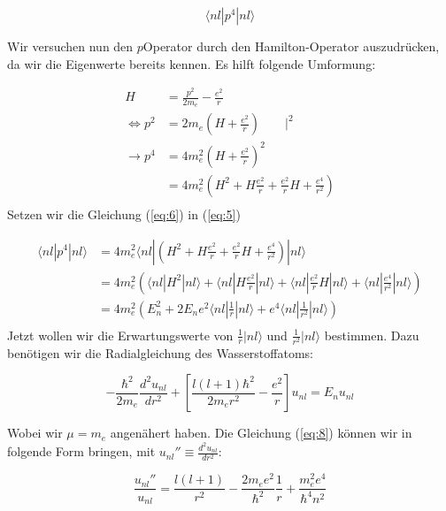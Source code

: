 \begin{equation}
  \label{eq:5}
  \langle nl|p^4|nl\rangle
\end{equation}


Wir versuchen nun den \(p\)Operator durch den Hamilton-Operator auszudrücken, da wir die Eigenwerte bereits kennen. Es hilft folgende Umformung:


\begin{align}
  \label{eq:6}
  H &= \frac{p^2}{2m_e}-\frac{e^2}{r} \\
\Leftrightarrow p^2 &= 2m_e\left( H + \frac{e^2}{r} \right) \qquad |^2\\
\rightarrow p^4 &= 4m_e^2\left( H + \frac{e^2}{r} \right)^2\\
&= 4m_e^2\left( H^2 + H \frac{e^2}{r}+ \frac{e^2}{r}H +\frac{e^4}{r^2}  \right)\\
\end{align}
Setzen wir die Gleichung (\ref{eq:6}) in (\ref{eq:5})

\begin{align}
  \label{eq:7}
  \langle nl|p^4|nl\rangle &= 4m_e^2 \langle nl|\left( H^2 + H \frac{e^2}{r}+ \frac{e^2}{r}H +\frac{e^4}{r^2}\right) |nl\rangle \\
 &= 4m_e^2 \left(  \langle nl| H^2|nl\rangle + \langle nl| H \frac{e^2}{r}|nl\rangle+ \langle nl| \frac{e^2}{r}H|nl\rangle + \langle nl|\frac{e^4}{r^2}|nl\rangle\right)  \\
 &= 4m_e^2 \left( E_n^2 + 2E_ne^2\langle nl| \frac{1}{r}|nl\rangle + e^4\langle nl|\frac{1}{r^2}|nl\rangle\right)  \\
\end{align}
Jetzt wollen wir die Erwartungswerte von \(\frac{1}{r}|nl\rangle\) und \(\frac{1}{r^2}|nl\rangle\) bestimmen. Dazu benötigen wir die Radialgleichung des Wasserstoffatoms:

\begin{equation}
  \label{eq:8}
  -\frac{\hbar^2}{2m_e}\frac{d^2u_{nl}}{dr^2} + \left[\frac{l(l+1)\hbar^2}{2m_e r^2}-\frac{e^2}{r}\right]u_{nl} = E_n u_{nl}
\end{equation}


Wobei wir \(\mu=m_e\) angenähert haben. Die Gleichung (\ref{eq:8}) können wir in folgende Form bringen, mit \(u_{nl}'' \equiv\frac{d^2u_{nl}}{dr^2} \):

\begin{equation}
  \label{eq:9}
  \frac{u_{nl}''}{u_{nl}} = \frac{l(l+1)}{r^2} - \frac{2m_e e^2}{\hbar^2}\frac{1}{r}+\frac{m_e^2e^4}{\hbar^4 n^2}
\end{equation}


